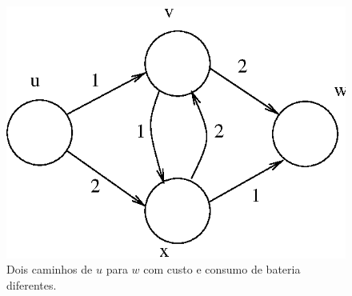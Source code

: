 \documentclass{article}
\begin{document}
\begin{figure}[ht]
  \centering
  \includegraphics[scale=.7]{fig3.eps}
  \caption{Dois caminhos de $u$ para $w$ com custo e consumo de bateria diferentes.}
  \label{fig3}
\end{figure}

\medskip
\printbibliography
\end{document}
